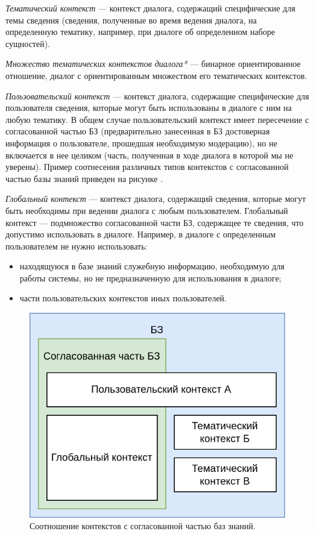 {\begin{SCn}
\end{SCn}

\textit{Тематический контекст} --- контекст диалога, содержащий специфические для темы сведения (сведения, полученные во время ведения диалога, на определенную тематику, например, при диалоге об определенном наборе сущностей).

\textit{Множество тематических контекстов диалога*} --- бинарное ориентированное отношение, диалог с ориентированным множеством его тематических контекстов.

\textit{Пользовательский контекст} --- контекст диалога, содержащие специфические для пользователя сведения, которые могут быть использованы в диалоге с ним на любую тематику.
В общем случае пользовательский контекст имеет пересечение с согласованной частью БЗ (предварительно занесенная в БЗ достоверная информация о пользователе, прошедшая необходимую модерацию), но не включается в нее целиком (часть, полученная в ходе диалога в которой мы не уверены).
Пример соотнесения различных типов контекстов с согласованной частью базы знаний приведен на рисунке \textit{}.

\textit{Глобальный контекст} --- контекст диалога, содержащий сведения, которые могут быть необходимы при ведении диалога с любым пользователем.
Глобальный контекст --- подмножество согласованной части БЗ, содержащее те сведения, что допустимо использовать в диалоге.
Например, в диалоге с определенным пользователем не нужно использовать:
\begin{itemize}
    \item находящуюся в базе знаний служебную информацию, необходимую для работы системы, но не предназначенную для использования в диалоге;
    \item части пользовательских контекстов иных пользователей.
\end{itemize}

\begin{figure}[h]
    \centering
    \includegraphics[scale=0.3]{images/part4/chapter_nl_interfaces/context_in_KB}
    \caption{Соотношение контекстов с согласованной частью баз знаний.}
    \label{fig:context_in_KB}
\end{figure}

}
